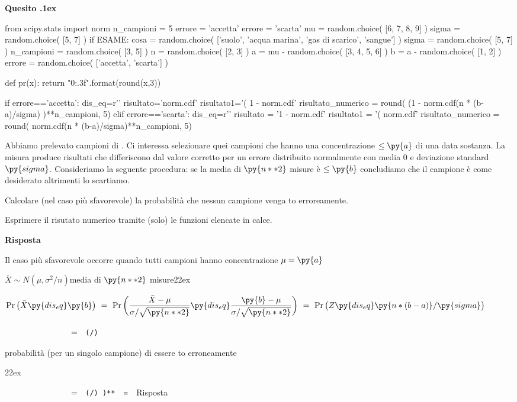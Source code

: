 \documentclass[11pt,twoside,a4paper]{article}
\def\Pr{{\rm Pr\,}}
\newcounter{quesito}
\newenvironment{question}{\addtocounter{quesito}{1}\bigskip\bigskip\par\textbf{Quesito \thequesito.\kern1ex}}{\vspace{\parskip}}
\newenvironment{answer}{\par\textbf{Risposta\quad}}{\vspace{\parskip}}
\begin{document}
\begin{question} 
\begin{pycode}
from scipy.stats import norm
n_campioni = 5
errore = 'accetta'
errore = 'scarta'
mu    = random.choice( [6, 7, 8, 9] )
sigma = random.choice( [5, 7] )
if ESAME:
    cosa = random.choice( ['suolo', 'acqua marina', 'gas di scarico', 'sangue'] )
    sigma = random.choice( [5, 7] )
    n_campioni = random.choice( [3, 5] )
    n = random.choice( [2, 3] )
    a = mu - random.choice( [3, 4, 5, 6] )
    b = a - random.choice( [1, 2] )
    errore =  random.choice( ['accetta', 'scarta'] )

def pr(x):
    return "{0:.3f}".format(round(x,3))

if errore=='accetta':
    dis_eq=r'\le'
    risultato='norm.cdf'
    risultato1='( 1 - norm.cdf'
    risultato_numerico = round( (1 -  norm.cdf(n * (b-a)/sigma) )**n_campioni, 5)
elif errore=='scarta':
    dis_eq=r'\ge'
    risultato = '1 - norm.cdf'
    risultato1 = '( norm.cdf'
    risultato_numerico = round( norm.cdf(n * (b-a)/sigma)**n_campioni, 5)
\end{pycode}
Abbiamo prelevato  campioni di . Ci interessa selezionare quei campioni che hanno una concentrazione $\le\py{a}$ di una data sostanza. La misura produce risultati che differiscono dal valore corretto per un errore distribuito normalmente con media $0$ e deviazione standard $\py{sigma}$. Consideriamo la seguente procedura: se la media di $\py{n**2}$ misure è $\le\py{b}$ concludiamo che il campione è come desiderato altrimenti lo scartiamo.

Calcolare (nel caso più sfavorevole) la probabilità che nessun campione venga to erroreamente.

Esprimere il risutato numerico tramite (solo) le funzioni elencate in calce.
\begin{answer}

Il caso più sfavorevole occorre quando tutti  campioni hanno concentrazione $\mu=\py{a}$ 


$\bar X\sim N(\mu,\sigma^2/n)$\hfill media di $\py{n**2}$ misure\kern22ex

$\Pr\big(\bar X\py{dis_eq}\py{b}\big)\ =\ \Pr\bigg(\dfrac{\bar X-\mu}{\sigma/\sqrt{\py{n**2}}}\py{dis_eq}\dfrac{\py{b}-\mu}{\sigma/\sqrt{\py{n**2}}}\bigg)\ =\  \Pr\big(Z\py{dis_eq}\py{n * (b-a) } /\py{sigma} \big)$\medskip

$\phantom{\Pr\big(\bar X\le\py{b}\big)}\ =\ ${\tt\ (/)}\hfill\parbox[t]{43ex}{ probabilità (per un singolo campione) di essere to erroneamente}\kern22ex\medskip

$\phantom{\Pr\big(\bar X\le\py{b}\big)}\ =\ ${\color{blue}\tt\ (/) )** }{\tt\ =\  }\hfill {\color{blue}Risposta}

\end{answer}
\end{question}
\end{document}
